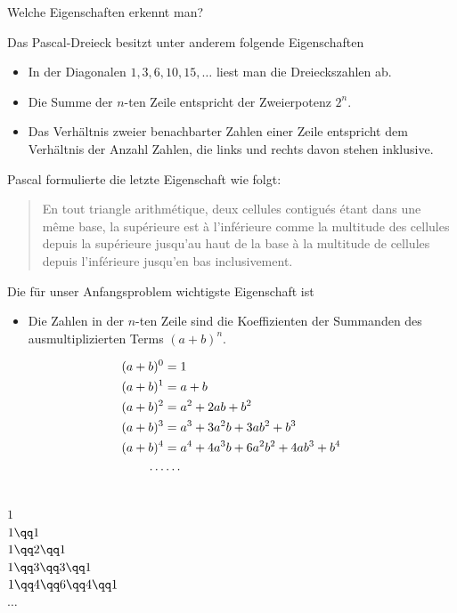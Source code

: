 \documentclass[%
11pt,%
twoside,%
titlepage,%
german,%
]{scrartcl}
\begin{document}
\begin{frage}
Welche Eigenschaften erkennt man?
\end{frage}

Das Pascal-Dreieck besitzt unter anderem folgende Eigenschaften
\begin{itemize}
\item In der Diagonalen $1,3,6,10,15,\dots$ liest man die Dreieckszahlen ab.
\item Die Summe der $n$-ten Zeile entspricht der Zweierpotenz $2^{n}$.
\item Das Verh\"altnis zweier benachbarter Zahlen einer Zeile entspricht dem Verh\"altnis der Anzahl Zahlen, die links und rechts davon stehen inklusive.
\end{itemize}

\noindent Pascal formulierte die letzte Eigenschaft wie folgt:
\begin{quote}
  \glqq En tout triangle arithmétique, deux cellules contigués étant dans
  une même base, la supérieure est à l'inférieure comme la multitude
  des cellules depuis la supérieure jusqu'au haut de la base à la
  multitude de cellules depuis l'inférieure jusqu'en bas
  inclusivement.\grqq
\end{quote}

Die f\"ur unser Anfangsproblem wichtigste Eigenschaft ist

\begin{itemize}
\item Die Zahlen in der $n$-ten Zeile sind die Koeffizienten der Summanden des ausmultiplizierten Terms $(a+b)^n$.
\end{itemize}

  \begin{align}
    (a+b)^0 &= 1\notag\\
    (a+b)^1 &= a+b\notag\\
    (a+b)^2 &= a^2+2ab+b^2\notag\\
    (a+b)^3 &= a^3+3a^2b+3ab^2+b^3\notag\\
    (a+b)^4 &= a^4+4a^3b+6a^2b^2+4ab^3+b^4\notag\\
    \dots &\dots\notag
  \end{align}

  \begin{center}
    \ \\[2pt]
    $1$\\[6pt]
    $1\qq1$\\[6pt]
    $1\qq2\qq1$\\[6pt]
    $1\qq3\qq3\qq1$\\[6pt]
    $1\qq4\qq6\qq4\qq1$\\[6pt]
    $\dots$
  \end{center}
\end{document}
